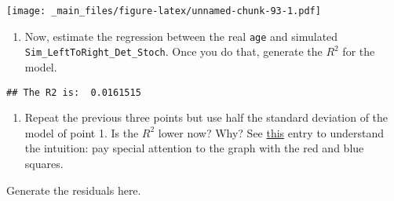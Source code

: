 \documentclass[
]{book}
\newenvironment{Shaded}{\begin{snugshade}}{\end{snugshade}}
\newcommand{\AttributeTok}[1]{\textcolor[rgb]{0.13,0.29,0.53}{#1}}
\newcommand{\CommentTok}[1]{\textcolor[rgb]{0.56,0.35,0.01}{\textit{#1}}}
\newcommand{\DecValTok}[1]{\textcolor[rgb]{0.00,0.00,0.81}{#1}}
\newcommand{\FloatTok}[1]{\textcolor[rgb]{0.00,0.00,0.81}{#1}}
\newcommand{\FunctionTok}[1]{\textcolor[rgb]{0.13,0.29,0.53}{\textbf{#1}}}
\newcommand{\NormalTok}[1]{#1}
\newcommand{\OtherTok}[1]{\textcolor[rgb]{0.56,0.35,0.01}{#1}}
\newcommand{\SpecialCharTok}[1]{\textcolor[rgb]{0.81,0.36,0.00}{\textbf{#1}}}
\newcommand{\StringTok}[1]{\textcolor[rgb]{0.31,0.60,0.02}{#1}}
\providecommand{\tightlist}{%
  \setlength{\itemsep}{0pt}\setlength{\parskip}{0pt}}
\begin{document}
\texttt{[image: \_main\_files/figure-latex/unnamed-chunk-93-1.pdf]}

\begin{enumerate}
\def\labelenumi{\arabic{enumi}.}
\setcounter{enumi}{4}
\tightlist
\item
  Now, estimate the regression between the real \texttt{age} and simulated \texttt{Sim\_LeftToRight\_Det\_Stoch}. Once you do that, generate the \(R^2\) for the model.
\end{enumerate}

\begin{Shaded}
\end{Shaded}

\begin{verbatim}
## The R2 is:  0.0161515
\end{verbatim}

\begin{enumerate}
\def\labelenumi{\arabic{enumi}.}
\setcounter{enumi}{6}
\tightlist
\item
  Repeat the previous three points but use half the standard deviation of the model of point 1. Is the \(R^2\) lower now? Why? See \href{https://en.wikipedia.org/wiki/Coefficient_of_determination}{this} entry to understand the intuition: pay special attention to the graph with the red and blue squares.
\end{enumerate}

Generate the residuals here.

\begin{Shaded}
\end{Shaded}
\end{document}
